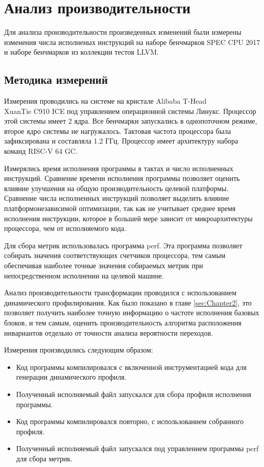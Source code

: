 \section{Анализ производительности}

Для анализа производительности произведенных изменений были измерены изменения числа исполненых инструкций на наборе бенчмарков SPEC CPU\textsuperscript{\tiny\textregistered} 2017 и наборе бенчмарков из коллекции тестов LLVM.

\subsection{Методика измерений}

Измерения проводились на системе на кристале Alibaba T-Head\\XuanTie C910 ICE под управлением операционной системы Линукс.
Процессор этой системы имеет 2 ядра.
Все бенчмарки запускались в однопоточном режиме, второе ядро системы не нагружалось.
Тактовая частота процессора была зафиксирована и составляла 1.2 ГГц.
Процессор имеет архитектуру набора команд RISC-V 64 GC.

Измерялись время исполнения программы в тактах и число исполненных инструкций.
Сравнение времени исполнения программы позволяет оценить влияние улучшения на общую производительность целевой платформы.
Сравнение числа исполненных инструкций позволяет выделить влияние платформонезависимой оптимизации, так как не учитывает среднее время исполнения инструкции, которое в большей мере зависит от микроархитектуры процессора, чем от исполняемого кода.

Для сбора метрик использовалась программа perf.
Эта программа позволяет собирать значения соответствующих счетчиков процессора, тем самым обеспечивая наиболее точные значения собираемых метрик при непосредственном исполнении на целевой машине.

Анализ производительности трансформации проводился с использованием динамического профилирования.
Как было показано в главе \ref{sec:Chapter2}, это позволяет получить наиболее точную информацию о частоте исполнения базовых блоков, и тем самым, оценить производительность алгоритма расположения инвариантов отдельно от точности анализа вероятности переходов.

Измерения производились следующим образом:
\begin{itemize}
    \item Код программы компилировался с включенной инструментацией кода для генерации динамического профиля.
    \item Полученный исполняемый файл запускался для сбора профиля исполнения программы.
    \item Код программы компилировался повторно, с использованием собранного профиля.
    \item Полученный исполняемый файл запускался под управлением программы perf для сбора метрик.
\end{itemize}

